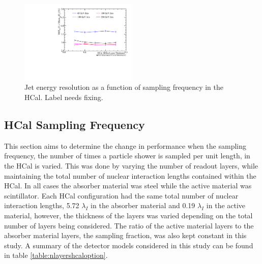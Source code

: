 \begin{figure}
\centering
\includegraphics[width=0.5\textwidth]{OptimisationStudies/Plots/JetEnergyResolutions/JER_vs_SamplingFractionInTheHCal.pdf}
\caption[Jet energy resolution as a function of sampling frequency in the HCal.]{Jet energy resolution as a function of sampling frequency in the HCal.  Label needs fixing.}
\label{fig:hcalsamplingfraction}
\end{figure}


\subsection{HCal Sampling Frequency}
\label{sec:hcalsamplingfrequency}
This section aims to determine the change in performance when the sampling frequency, the number of times a particle shower is sampled per unit length, in the HCal is varied.  This was done by varying the number of readout layers, while maintaining the total number of nuclear interaction lengths contained within the HCal.  In all cases the absorber material was steel while the active material was scintillator.  Each HCal configuration had the same total number of nuclear interaction lengths, 5.72 $\lambda_{I}$ in the absorber material and 0.19 $\lambda_{I}$ in the active material, however, the thickness of the layers was varied depending on the total number of layers being considered.  The ratio of the active material layers to the absorber material layers, the sampling fraction, was also kept constant in this study.  A summary of the detector models considered in this study can be found in table \ref{table:nlayershcaloption}.  

